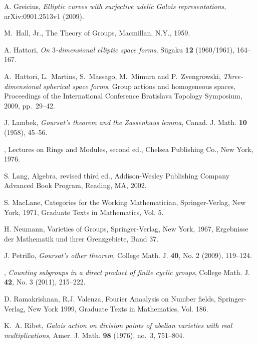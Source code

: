\documentclass[11pt]{article}
\theoremstyle{change}
\newcommand{\<}{\langle}
\renewcommand{\>}{\rangle}
\begin{document}
\begin{thebibliography}{{S. }09}
 A. Greicius, \emph{Elliptic curves with surjective
adelic Galois representations}, arXiv:0901.2513v1 (2009).

M.~Hall, Jr., {The Theory of Groups}, Macmillan, N.Y., 1959. 

A. Hattori, \emph{On {$3$}-dimensional elliptic space forms}, S{\=u}gaku
  \textbf{12} (1960/1961), 164--167. 

A.~Hattori, L.~Martins, S.~Massago, M.~Mimura and P.~Zvengrowski,
  \emph{Three-dimensional spherical space forms}, Group actions and homogeneous
  spaces, Proceedings of the International Conference Bratislava Topology
  Symposium, 2009, pp.~29--42.

J. Lambek, \emph{Goursat's theorem and the {Z}assenhaus lemma}, Canad. J.
  Math. \textbf{10} (1958), 45--56. 

\bysame, {Lectures on {R}ings and {M}odules}, second ed., Chelsea Publishing
  Co., New York, 1976. 

S. Lang, {Algebra}, revised third ed., Addison-Wesley Publishing Company
  Advanced Book Program, Reading, MA, 2002. 

S. MacLane, {Categories for the {W}orking {M}athematician},
  Springer-Verlag, New York, 1971, Graduate Texts in Mathematics, Vol. 5.

 H. Neumann,   {Varieties of Groups},  Springer-Verlag, New York, 1967, Ergebnisse der Mathematik und ihrer Grenzgebiete, Band 37.

J. Petrillo, \emph{Goursat's other theorem}, College Math. J. \textbf{40},
  No. 2 (2009), 119--124.

\bysame, \emph{Counting subgroups in a direct product of finite cyclic groups},
  College Math. J. \textbf{42}, No. 3 (2011), 215--222.

 D. Ramakrishnan, R.J. Valenza, {Fourier Anaalysis on Number fields}, Springer-Verlag, New York 1999, Graduate Texts in Mathematics, Vol. 186. 

K.~A. Ribet, \emph{Galois action on division points of abelian varieties
  with real multiplications}, Amer. J. Math. \textbf{98} (1976), no.~3,
  751--804. 


\end{thebibliography}
\end{document}
